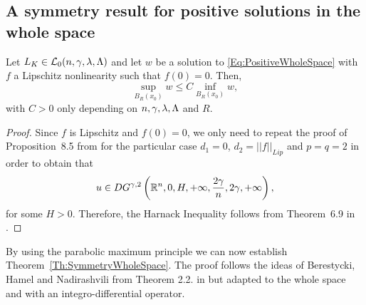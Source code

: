 
\subsection{A symmetry result for positive solutions in the whole space}



\begin{proposition}
	\label{Prop:HarnackSemilinear}
	Let $L_K\in\mathcal{L}_0(n,\gamma,\lambda,\Lambda)$ and let $w$ be a solution to \eqref{Eq:PositiveWholeSpace} with $f$ a Lipschitz nonlinearity such that $f(0) = 0$. Then,
	$$ \sup_{B_R(x_0)} w \leq C  \inf_{B_R(x_0)} w, $$
	with $C>0$ only depending on $n,\gamma,\lambda,\Lambda$ and $R$.
\end{proposition}

\begin{proof}
	Since $f$ is Lipschitz and $f(0) = 0$, we only need to repeat the proof of Proposition~8.5 from \cite{Cozzi-DeGiorgiClassesLong} for the particular case $d_1=0$, $d_2 =||f||_{Lip}$ and $p=q=2$ in order to obtain that
	$$ u\in DG^{\gamma,2} \left( \mathbb{R}^n , 0, H, +\infty,\frac{2\gamma}{n},2\gamma,+\infty \right), $$
	for some $H>0$. Therefore, the Harnack Inequality follows from Theorem~6.9 in \cite{Cozzi-DeGiorgiClassesLong}.
\end{proof}

By using the parabolic maximum principle we can now establish Theorem~\ref{Th:SymmetryWholeSpace}. The proof follows the ideas of Berestycki, Hamel and Nadirashvili from Theorem 2.2. in
\cite{BerestyckiHamelNadi} but adapted to the whole space and with an integro-differential
operator.

